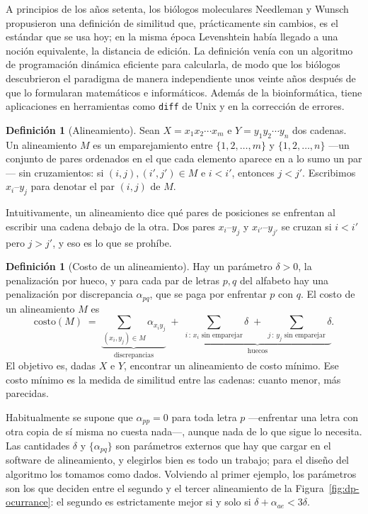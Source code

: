 \documentclass[12pt, spanish, oneside, openany]{book}
\theoremstyle{uprightplain}
\theoremstyle{definition}
\newtheorem{definicion}[teorema]{Definición}
\theoremstyle{remark}
\theoremstyle{definition}
\begin{document}
A principios de los años setenta, los biólogos moleculares Needleman y Wunsch propusieron una definición de similitud que, prácticamente sin cambios, es el estándar que se usa hoy; en la misma época Levenshtein había llegado a una noción equivalente, la distancia de edición. La definición venía con un algoritmo de programación dinámica eficiente para calcularla, de modo que los biólogos descubrieron el paradigma de manera independiente unos veinte años después de que lo formularan matemáticos e informáticos. Además de la bioinformática, tiene aplicaciones en herramientas como \texttt{diff} de Unix y en la corrección de errores.

\begin{definicion}[Alineamiento]
\label{def:dp-alineamiento}
Sean $X=x_1x_2\cdots x_m$ e $Y=y_1y_2\cdots y_n$ dos cadenas. Un alineamiento $M$ es un emparejamiento entre $\{1,2,\dots,m\}$ y $\{1,2,\dots,n\}$ ---un conjunto de pares ordenados en el que cada elemento aparece en a lo sumo un par--- sin cruzamientos: si $(i,j),(i',j')\in M$ e $i<i'$, entonces $j<j'$. Escribimos $x_i$--$y_j$ para denotar el par $(i,j)$ de $M$.
\end{definicion}

Intuitivamente, un alineamiento dice qué pares de posiciones se enfrentan al escribir una cadena debajo de la otra. Dos pares $x_i$--$y_j$ y $x_{i'}$--$y_{j'}$ se cruzan si $i<i'$ pero $j>j'$, y eso es lo que se prohíbe.

\begin{definicion}[Costo de un alineamiento]
\label{def:dp-costo-alineamiento}
Hay un parámetro $\delta>0$, la penalización por hueco, y para cada par de letras $p,q$ del alfabeto hay una penalización por discrepancia $\alpha_{pq}$, que se paga por enfrentar $p$ con $q$. El costo de un alineamiento $M$ es
\[
\mathrm{costo}(M) \;=\; \underbrace{\sum_{(x_i,y_j)\in M}\alpha_{x_iy_j}}_{\text{discrepancias}}
\;+\; \underbrace{\sum_{i\,:\,x_i\text{ sin emparejar}}\delta \;+\; \sum_{j\,:\,y_j\text{ sin emparejar}}\delta}_{\text{huecos}} .
\]
El objetivo es, dadas $X$ e $Y$, encontrar un alineamiento de costo mínimo. Ese costo mínimo es la medida de similitud entre las cadenas: cuanto menor, más parecidas.
\end{definicion}

Habitualmente se supone que $\alpha_{pp}=0$ para toda letra $p$ ---enfrentar una letra con otra copia de sí misma no cuesta nada---, aunque nada de lo que sigue lo necesita. Las cantidades $\delta$ y $\{\alpha_{pq}\}$ son parámetros externos que hay que cargar en el software de alineamiento, y elegirlos bien es todo un trabajo; para el diseño del algoritmo los tomamos como dados. Volviendo al primer ejemplo, los parámetros son los que deciden entre el segundo y el tercer alineamiento de la Figura~\ref{fig:dp-ocurrance}: el segundo es estrictamente mejor si y solo si $\delta+\alpha_{ae}<3\delta$.
\end{document}
